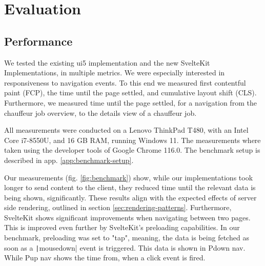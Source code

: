\chapter{Evaluation}
\label{ch:evaluation}


\section{Performance}


We tested the existing ui5 implementation and the new SvelteKit Implementations, in multiple metrics. We were especially interested in responsiveness to navigation events. To this end we measured first contentful paint (FCP), the time until the page settled, and cumulative layout shift (CLS). Furthermore, we measured time until the page settled, for a navigation from the chauffeur job overview, to the details view of a chauffeur job.

All measurements were conducted on a Lenovo ThinkPad T480, with an Intel Core i7-8550U, and 16 GB RAM, running Windows 11. The measurements where taken using the developer tools of Google Chrome 116.0. The benchmark setup is described in app. \ref{app:benchmark-setup}.

Our measurements (fig. \ref{fig:benchmark}) show, while our implementations took longer to send content to the client, they reduced time until the relevant data is being shown, significantly. These results align with the expected effects of server side rendering, outlined in section \ref{sec:rendering-patterns}. Furthermore, SvelteKit shows significant improvements when navigating between two pages. This is improved even further by SvelteKit's preloading capabilities. In our benchmark, preloading was set to "tap", meaning, the data is being fetched as soon as a \texttt|mousedown| event is triggered. This data is shown in Pdown nav. While Pup nav shows the time from, when a click event is fired.  

